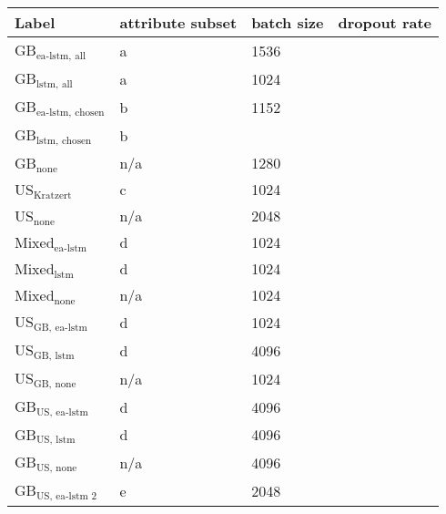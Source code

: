 \begin{tabular}{llll}
    \toprule
    Label & attribute subset & batch size & dropout rate\\
    \midrule
    GB$_\text{ea-lstm, all}$ & a &  1536 \\
    GB$_\text{lstm, all}$ & a & 1024 \\
    GB$_\text{ea-lstm, chosen}$ & b & 1152 \\
    GB$_\text{lstm, chosen}$ & b &  \\
    GB$_\text{none}$ & n/a & 1280 \\
    US$_\text{Kratzert}$  & c & 1024 \\
    US$_\text{none}$  & n/a & 2048 \\
    Mixed$_\text{ea-lstm}$ & d & 1024 \\
    Mixed$_\text{lstm}$ & d & 1024 \\
    Mixed$_\text{none}$ & n/a & 1024 \\
    US$_\text{GB, ea-lstm}$ & d  & 1024 \\
    US$_\text{GB, lstm}$ & d  & 4096 \\
    US$_\text{GB, none}$ & n/a & 1024 \\
    GB$_\text{US, ea-lstm}$ & d & 4096 \\
    GB$_\text{US, lstm}$  & d & 4096 \\ 
    GB$_\text{US, none}$  & n/a & 4096 \\
    GB$_\text{US, ea-lstm 2}$ & e & 2048 \\

\end{tabular}

